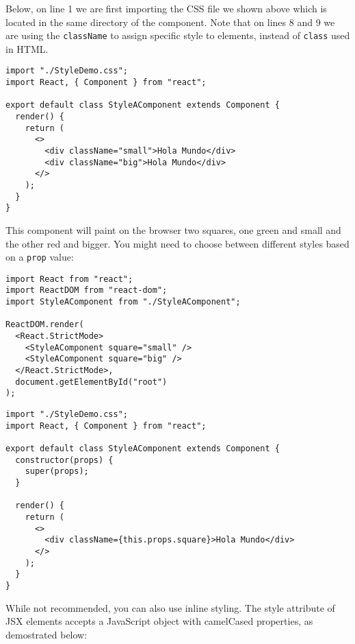 \documentclass[a4paper, oneside, titlepage, 12pt]{book}
\begin{document}
Below, on line 1 we are first importing the CSS file we shown above which is located in the same directory of the component. Note that on lines 8 and 9 we are using the \texttt{className} to assign specific style to elements, instead of \texttt{class} used in HTML.

\begin{verbatim}
import "./StyleDemo.css";
import React, { Component } from "react";

export default class StyleAComponent extends Component {
  render() {
    return (
      <>
        <div className="small">Hola Mundo</div>
        <div className="big">Hola Mundo</div>
      </>
    );
  }
}
\end{verbatim}

This component will paint on the browser two squares, one green and small and the other red and bigger. You might need to choose between different styles based on a \texttt{prop} value:

\begin{verbatim}
import React from "react";
import ReactDOM from "react-dom";
import StyleAComponent from "./StyleAComponent";

ReactDOM.render(
  <React.StrictMode>
    <StyleAComponent square="small" />
    <StyleAComponent square="big" />
  </React.StrictMode>,
  document.getElementById("root")
);
\end{verbatim}

\begin{verbatim}
import "./StyleDemo.css";
import React, { Component } from "react";

export default class StyleAComponent extends Component {
  constructor(props) {
    super(props);
  }

  render() {
    return (
      <>
        <div className={this.props.square}>Hola Mundo</div>
      </>
    );
  }
}
\end{verbatim}

While not recommended, you can also use inline styling. The style attribute of JSX elements accepts a JavaScript object with camelCased properties, as demostrated below:
\end{document}
